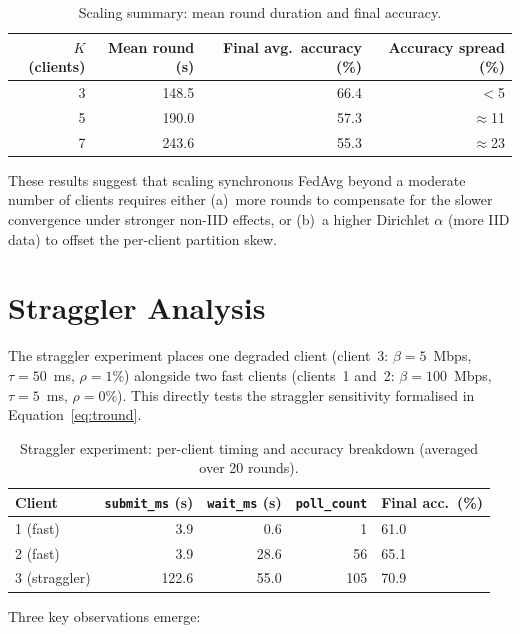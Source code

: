 \documentclass[12pt,a4paper]{report}
\begin{document}
\begin{table}[H]
\centering
\caption{Scaling summary: mean round duration and final accuracy.}
\label{tab:scale}
\begin{tabular}{rrrr}
\toprule
$K$ (clients) & Mean round (s) & Final avg.\ accuracy (\%) & Accuracy spread (\%) \\
\midrule
3 & 148.5 & 66.4 & $<$5 \\
5 & 190.0 & 57.3 & $\approx$11 \\
7 & 243.6 & 55.3 & $\approx$23 \\
\bottomrule
\end{tabular}
\end{table}

These results suggest that scaling synchronous FedAvg beyond a moderate
number of clients requires either (a)~more rounds to compensate for the
slower convergence under stronger non-IID effects, or (b)~a higher
Dirichlet $\alpha$ (more IID data) to offset the per-client partition
skew.

\section{Straggler Analysis}
\label{sec:straggler_results}

The straggler experiment places one degraded client (client~3:
$\beta = 5$~Mbps, $\tau = 50$~ms, $\rho = 1\%$) alongside two fast
clients (clients~1 and~2: $\beta = 100$~Mbps, $\tau = 5$~ms,
$\rho = 0\%$).  This directly tests the straggler sensitivity formalised
in Equation~\ref{eq:tround}.

\begin{table}[H]
\centering
\caption{Straggler experiment: per-client timing and accuracy breakdown
  (averaged over 20 rounds).}
\label{tab:straggler}
\begin{tabular}{lrrrl}
\toprule
Client & \texttt{submit\_ms} (s) & \texttt{wait\_ms} (s) &
  \texttt{poll\_count} & Final acc.\ (\%) \\
\midrule
1 (fast)     & 3.9   & 0.6   & 1   & 61.0 \\
2 (fast)     & 3.9   & 28.6  & 56  & 65.1 \\
3 (straggler) & 122.6 & 55.0  & 105 & 70.9 \\
\bottomrule
\end{tabular}
\end{table}

Three key observations emerge:
\end{document}

